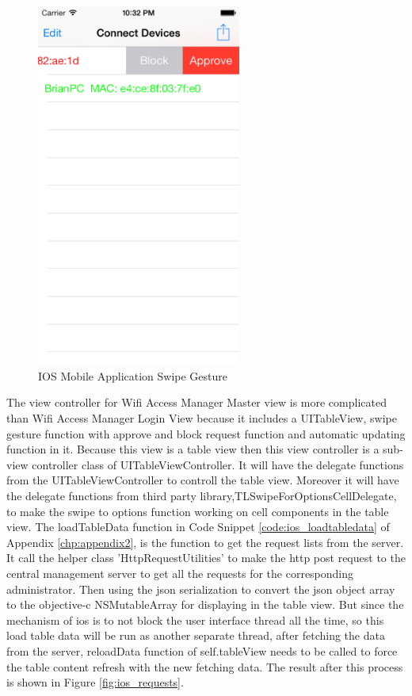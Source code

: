 \begin{figure}
\begin{minipage}{0.45\textwidth}
    		\includegraphics[width=0.6\textwidth,natwidth=610,natheight=642]{figs/ios_app_manage_gesture.png}
  		\caption{IOS Mobile Application Swipe Gesture}
  		\label{fig:ios_swipe}
  	\end{minipage}
\end{figure}

\par The view controller for Wifi Access Manager Master view is more complicated than Wifi Access Manager Login View because it includes a UITableView, swipe gesture function with approve and block request function and automatic updating function in it. Because this view is a table view then this view controller is a sub-view controller  class of UITableViewController. It will have the delegate functions from the UITableViewController to controll the table view. Moreover it will have the delegate functions from third party library,TLSwipeForOptionsCellDelegate, to make the swipe to options function working on cell components in the table view. The loadTableData function in Code Snippet \ref{code:ios_loadtabledata} of Appendix \ref{chp:appendix2}, is the function to get the request lists from the server. It call the helper class 'HttpRequestUtilities' to make the \gls{http} post request to the central management server to get all the requests for the corresponding administrator. Then using the \gls{json} serialization to convert the \gls{json} object array to the objective-c NSMutableArray for displaying in the table view. But since the mechanism of \gls{ios} is to not block the user interface thread all the time, so this load table data will be run as another separate thread, after fetching the data from the server, reloadData function of self.tableView needs to be called to force the table content refresh with the new fetching data. The result after this process is shown in Figure \ref{fig:ios_requests}.

